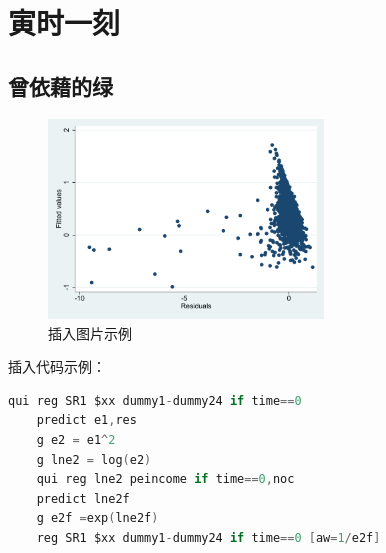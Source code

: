 
\chapter{寅时一刻}
\section{曾依藉的绿}
\begin{figure}[H]
    \centering
    \includegraphics[width=0.65\textwidth]{figure/cancha.pdf}
    \caption{插入图片示例}
\end{figure}


插入代码示例：
\begin{lstlisting}[language=C]
    qui reg SR1 $xx dummy1-dummy24 if time==0
    predict e1,res
    g e2 = e1^2
    g lne2 = log(e2)
    qui reg lne2 peincome if time==0,noc
    predict lne2f
    g e2f =exp(lne2f)
    reg SR1 $xx dummy1-dummy24 if time==0 [aw=1/e2f]
\end{lstlisting}

